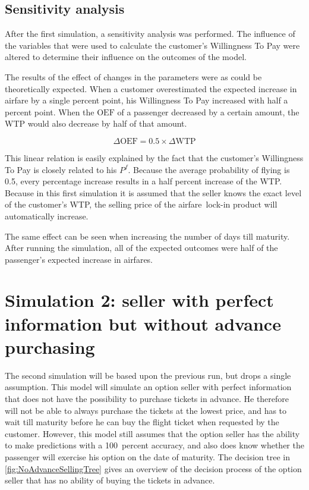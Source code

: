 \subsection{Sensitivity analysis}
After the first simulation, a sensitivity analysis was performed. The influence of the variables that were used to calculate the customer's Willingness To Pay were altered to determine their influence on the outcomes of the model.

The results of the effect of changes in the parameters were as could be theoretically expected. When a customer overestimated the expected increase in airfare by a single percent point, his Willingness To Pay increased with half a percent point. When the $\mbox{OEF}$ of a passenger decreased by a certain amount, the WTP would also decrease by half of that amount. 

$$ \Delta{\mbox{OEF}} = 0.5 \times \Delta{\mbox{WTP}} $$

This linear relation is easily explained by the fact that the customer's Willingness To Pay is closely related to his $P^f$. Because the average probability of flying is 0.5, every percentage increase results in a half percent increase of the WTP. Because in this first simulation it is assumed that the seller knows the exact level of the customer's WTP, the selling price of the airfare~lock-in product will automatically increase.

The same effect can be seen when increasing the number of days till maturity. After running the simulation, all of the expected outcomes were half of the passenger's expected increase in airfares.


\section{Simulation 2: seller with perfect information but without advance purchasing}
The second simulation will be based upon the previous run, but drops a single assumption. This model will simulate an option seller with perfect information that does not have the possibility to purchase tickets in advance. He therefore will not be able to always purchase the tickets at the lowest price, and has to wait till maturity before he can buy the flight ticket when requested by the customer. However, this model still assumes that the option seller has the ability to make predictions with a 100~percent accuracy, and also does know whether the passenger will exercise his option on the date of maturity. The decision tree in \autoref{fig:NoAdvanceSellingTree} gives an overview of the decision process of the option seller that has no ability of buying the tickets in advance.

